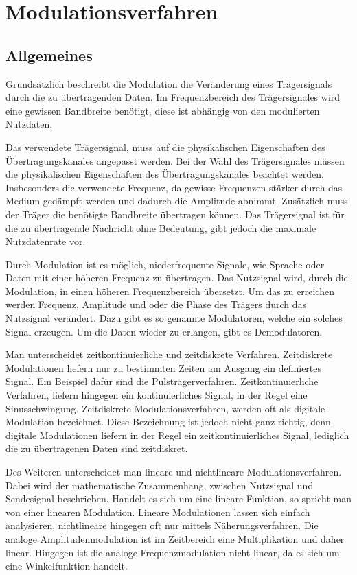 \chapter{Modulationsverfahren}
\label{cha:Modulation}
\section{Allgemeines}
Grundsätzlich beschreibt die Modulation die Veränderung eines Trägersignals durch die zu übertragenden Daten. Im Frequenzbereich des Trägersignales wird eine gewissen Bandbreite benötigt, diese ist abhängig von den modulierten Nutzdaten. 

Das verwendete Trägersignal, muss auf die physikalischen Eigenschaften des Übertragungskanales angepasst werden. Bei der Wahl des Trägersignales müssen die physikalischen Eigenschaften des Übertragungskanales beachtet werden. Insbesonders die verwendete Frequenz, da gewisse Frequenzen  stärker durch das Medium gedämpft werden und dadurch die Amplitude abnimmt. Zusätzlich muss der Träger die benötigte Bandbreite übertragen können. Das Trägersignal ist für die zu übertragende Nachricht ohne Bedeutung, gibt jedoch die maximale Nutzdatenrate vor. 

Durch Modulation ist es möglich, niederfrequente Signale, wie Sprache oder Daten mit einer höheren Frequenz zu übertragen. Das Nutzsignal wird, durch die Modulation, in einen höheren Frequenzbereich übersetzt. Um das zu erreichen werden Frequenz, Amplitude und oder die Phase des Trägers durch das Nutzsignal verändert. Dazu gibt es so genannte Modulatoren, welche ein solches Signal erzeugen. Um die Daten wieder zu erlangen, gibt es Demodulatoren.
 
Man unterscheidet zeitkontinuierliche und zeitdiskrete Verfahren. Zeitdiskrete Modulationen liefern nur zu bestimmten Zeiten am Ausgang ein definiertes Signal. Ein Beispiel dafür sind die Pulsträgerverfahren. Zeitkontinuierliche Verfahren, liefern hingegen ein kontinuierliches Signal, in der Regel eine Sinusschwingung. Zeitdiskrete Modulationsverfahren, werden oft als digitale Modulation bezeichnet. Diese Bezeichnung ist jedoch nicht ganz richtig, denn digitale Modulationen liefern in der Regel ein zeitkontinuierliches Signal, lediglich die zu übertragenen Daten sind zeitdiskret.

Des Weiteren unterscheidet man lineare und nichtlineare Modulationsverfahren. Dabei wird der mathematische Zusammenhang, zwischen Nutzsignal und Sendesignal beschrieben. Handelt es sich um eine lineare Funktion, so spricht man von einer linearen Modulation. Lineare Modulationen lassen sich einfach analysieren, nichtlineare hingegen oft nur mittels Näherungsverfahren. Die analoge Amplitudenmodulation ist im Zeitbereich eine Multiplikation und daher linear. Hingegen ist die analoge Frequenzmodulation nicht linear, da es sich um eine Winkelfunktion handelt.

